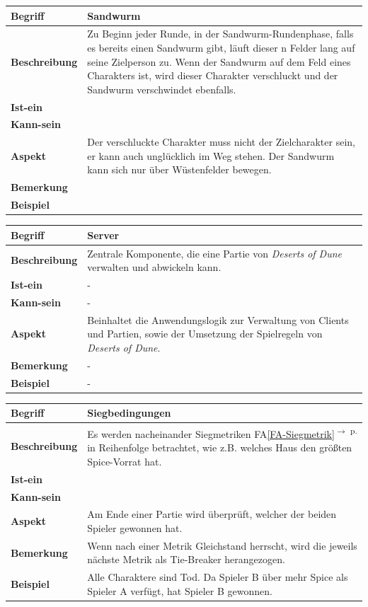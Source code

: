 \documentclass[12pt]{article}
\newcounter{fa}
\newcounter{nfa}
\newcommand{\faref}[1]{FA\ref{#1}\textsuperscript{$\rightarrow$ p. \pageref{#1}}}
\begin{document}
\begin{tabularx}{\linewidth}{|l|X|}
\hline
\textbf{Begriff} & \textbf{Sandwurm} \\
\hline
\textbf{Beschreibung} & Zu Beginn jeder Runde, in der Sandwurm-Rundenphase, falls es bereits einen Sandwurm gibt, läuft dieser n Felder lang auf seine Zielperson zu. Wenn der Sandwurm auf dem Feld eines Charakters ist, wird dieser Charakter verschluckt und der Sandwurm verschwindet ebenfalls.  \\
\hline
\textbf{Ist-ein} & \\
\hline
\textbf{Kann-sein} & \\
\hline
\textbf{Aspekt} & Der verschluckte Charakter muss nicht der Zielcharakter sein, er kann auch unglücklich im Weg stehen. Der Sandwurm kann sich nur über Wüstenfelder bewegen. \\
\hline
\textbf{Bemerkung} &  \\
\hline
\textbf{Beispiel} &  \\
\hline
\end{tabularx}

\begin{tabularx}{\linewidth}{|l|X|}
\hline
\textbf{Begriff} & \textbf{Server} \\
\hline
\textbf{Beschreibung} & Zentrale Komponente, die eine Partie von \textit{Deserts of Dune} verwalten und abwickeln kann. \\
\hline
\textbf{Ist-ein} & - \\
\hline
\textbf{Kann-sein} & - \\
\hline
\textbf{Aspekt} & Beinhaltet die Anwendungslogik zur Verwaltung von Clients und Partien, sowie der Umsetzung der Spielregeln von \textit{Deserts of Dune}. \\
\hline
\textbf{Bemerkung} & - \\
\hline
\textbf{Beispiel} & - \\
\hline
\end{tabularx}

\begin{tabularx}{\linewidth}{|l|X|}
\hline
\textbf{Begriff} & \textbf{Siegbedingungen} \\
\hline
\textbf{Beschreibung} & Es werden nacheinander Siegmetriken \faref{FA-Siegmetrik} in Reihenfolge betrachtet, wie z.B. welches Haus den größten Spice-Vorrat hat. \\
\hline
\textbf{Ist-ein} & \\
\hline
\textbf{Kann-sein} & \\
\hline
\textbf{Aspekt} & Am Ende einer Partie wird überprüft, welcher der beiden Spieler gewonnen hat. \\
\hline
\textbf{Bemerkung} & Wenn nach einer Metrik Gleichstand herrscht, wird die jeweils nächste Metrik als Tie-Breaker herangezogen. \\
\hline
\textbf{Beispiel} & Alle Charaktere sind Tod. Da Spieler B über mehr Spice als Spieler A verfügt, hat Spieler B gewonnen. \\
\hline
\end{tabularx}
\end{document}
